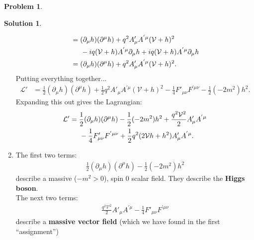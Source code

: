 \documentclass{book}
\numberwithin{equation}{section}
\theoremstyle{definition}
\newtheorem{prob}{Problem}[section]
\newtheorem{sln}{Solution}[section]
\newcommand{\p}{\partial}
\newcommand{\lag}{\mathcal{L}}
\newcommand{\V}{\mathcal{V}}
\begin{document}
\begin{prob}
\begin{sln}
\begin{enumerate}
\begin{align}
				&= (\p_\mu h)(\p^\mu h) + q^2 A'_\mu A^{'\mu}(\V+h)^2\nonumber\\
				&\hspace{0.5cm} -iq(\V+h) A^{'\mu} \p_\mu h + iq(\V+h)A^{'\mu}\p_\mu h\nonumber\\
				&= (\p_\mu h)(\p^\mu h) + q^2 A'_\mu A^{'\mu}(\V+h)^2.
				\end{align}
				Putting everything together...
				\begin{align}
				\lag' &= \frac{1}{2}(\p_\mu h)(\p^\mu h) + \frac{1}{2}q^2 A'_\mu A^{'\mu}(\V+h)^2 - \frac{1}{4}F'_{\mu\nu}F^{'\mu\nu} - \frac{1}{2}(-2m^2)h^2.
				\end{align}
				Expanding this out gives the Lagrangian:
				\begin{align}
				\lag' &= \frac{1}{2}(\p_\mu h)(\p^\mu h) - \frac{1}{2}(-2m^2)h^2 + \frac{q^2\V^2}{2}A'_\mu A^{'\mu}\nonumber\\ 
				&\hspace{0.5cm} - \frac{1}{4}F'_{\mu\nu}F^{'\mu\nu} + \frac{1}{2}q^2(2\V h + h^2)A'_\mu A^{'\mu}.
				\end{align}
				
				
				
				
				
				
				
				
				
				
				
				
				
				
				
				
				
				
				
				
				
				
				
				
				
				
				\item The first two terms:
				\begin{align}
				\boxed{\frac{1}{2}(\p_\mu h)(\p^\mu h) - \frac{1}{2}(-2m^2)h^2}
				\end{align}
				describe a massive ($-m^2 > 0$), spin 0 scalar field. They describe the \textbf{Higgs boson}.\\
				
				The next two terms:
				\begin{align}
				\boxed{\frac{q^2\V^2}{2}A'_\mu A^{'\mu} - \frac{1}{4}F'_{\mu\nu}F^{'\mu\nu}}
				\end{align}
				describe a \textbf{massive vector field} (which we have found in the first ``assignment'')\\
				

\end{enumerate}
\end{sln}
\end{prob}
\end{document}
